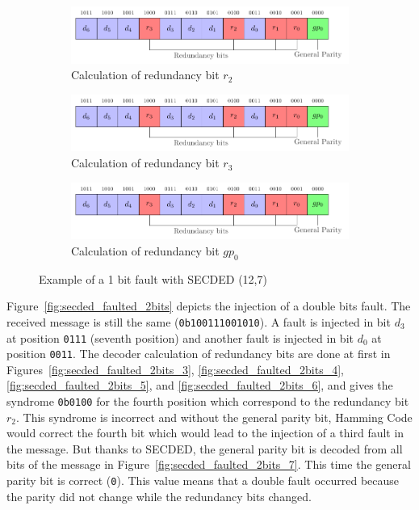\begin{figure}[ht]
    \hfill
    \begin{subfigure}[b]{0.49\textwidth}
        \includegraphics[width=\textwidth, page=9]{c5_countermeasures_dift/img/secded.pdf}
        \caption{Calculation of redundancy bit $r_2$}
        \label{fig:secded_faulted_1bit_5}
    \end{subfigure}
    \hfill
    \begin{subfigure}[b]{0.49\textwidth}
        \includegraphics[width=\textwidth, page=10]{c5_countermeasures_dift/img/secded.pdf}
        \caption{Calculation of redundancy bit $r_3$}
        \label{fig:secded_faulted_1bit_6}
    \end{subfigure}
    \hfill
    \begin{subfigure}[b]{0.49\textwidth}
        \includegraphics[width=\textwidth, page=11]{c5_countermeasures_dift/img/secded.pdf}
        \caption{Calculation of redundancy bit $gp_0$}
        \label{fig:secded_faulted_1bit_7}
    \end{subfigure}
    \caption{Example of a 1 bit fault with SECDED (12,7)}
    \label{fig:secded_faulted_1bit}
\end{figure}

Figure~\ref{fig:secded_faulted_2bits} depicts the injection of a double bits fault. The received message is still the same (\texttt{0b100111001010}). A fault is injected in bit $d_3$ at position \texttt{0111} (seventh position) and another fault is injected in bit $d_0$ at position \texttt{0011}.
The decoder calculation of redundancy bits are done at first in Figures~\ref{fig:secded_faulted_2bits_3}, \ref{fig:secded_faulted_2bits_4}, \ref{fig:secded_faulted_2bits_5}, and \ref{fig:secded_faulted_2bits_6}, and gives the syndrome \texttt{0b0100} for the fourth position which correspond to the redundancy bit $r_2$. This syndrome is incorrect and without the general parity bit, Hamming Code would correct the fourth bit which would lead to the injection of a third fault in the message.
But thanks to SECDED, the general parity bit is decoded from all bits of the message in Figure~\ref{fig:secded_faulted_2bits_7}. This time the general parity bit is correct (\texttt{0}). This value means that a double fault occurred because the parity did not change while the redundancy bits changed.

